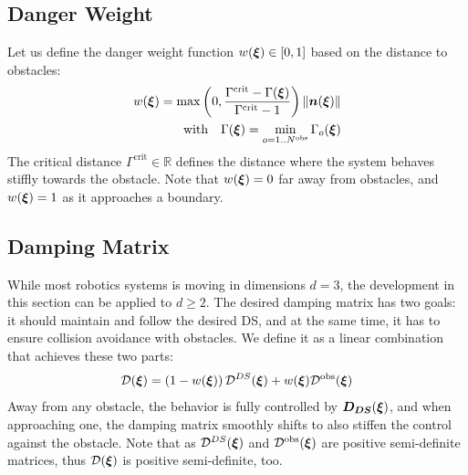 \documentclass[conference]{IEEEtran}
\begin{document}
\subsection{Danger Weight}
Let us define the danger weight function $w(\boldsymbol{\xi}) \in [0, 1]$ based on the distance to obstacles:
\begin{equation}
  \begin{split}
w(\vecs\xi) =
\max \left(0,  \frac{\Gamma^{\mathrm{crit}} - \Gamma(\vecs\xi)}{\Gamma^{\mathrm{crit}} - 1} \right) \| \vecs n(\vecs \xi) \| \\
\text{with} \quad
\Gamma(\vecs\xi) = \min_{o = 1..N^{\mathrm{obs}}} \Gamma_o(\vecs\xi)
\label{eq:weight_function}
\end{split}
\end{equation}
The critical distance $\Gamma^{\mathrm{crit}} \in \mathbb{R}$ defines the distance where the system behaves stiffly towards the obstacle.
Note that $w(\boldsymbol{\xi}) = 0$ far away from obstacles, and $w(\boldsymbol{\xi}) = 1$ as it approaches a boundary.

\subsection{Damping Matrix}
While most robotics systems is moving in dimensions $d = 3$, the development in this section can be applied to $d \geq 2$.
The desired damping matrix has two goals: it should maintain and follow the desired DS, and at the same time, it has to ensure collision avoidance with obstacles. We define it as a linear combination that achieves these two parts:
\begin{equation}
    \matd D(\vecs\xi) = \left(1 - w(\vecs\xi) \right) {\matd D^{DS}}(\vecs\xi) + w(\vecs\xi)  {\matd D^{\mathrm{obs}}}(\vecs\xi) \label{eq:damping_summation}
\end{equation}
Away from any obstacle, the behavior is fully controlled by $\boldsymbol{D_{DS}}(\boldsymbol{\xi})$, and when approaching one, the damping matrix smoothly shifts to also stiffen the control against the obstacle. 
Note that as ${\mathcal{D}^{DS}}(\boldsymbol{\xi})$ and $\mathcal{D^{\mathrm{obs}}}(\boldsymbol{\xi})$ are positive semi-definite matrices, thus $\mathcal{D}(\boldsymbol{\xi})$ is positive semi-definite, too.
\end{document}

